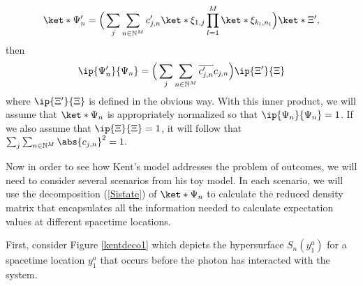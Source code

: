 \documentclass[12pt]{report}
\begin{document}
$$ \ket*{\Psi_n'}=\Big(\sum_j\sum_{n\in\mathbb{N}^M} c'_{j,n}\ket*{\xi_{1,j}}\prod_{l=1}^{M}\ket*{\xi_{k_{l},n_l}}\Big)\ket*{\Xi'},$$ then
$$\ip{\Psi_n'}{\Psi_n}=\Big(\sum_j\sum_{n\in\mathbb{N}^M} \overline{c'_{j,n}}c_{j,n} \Big) \ip{\Xi'}{\Xi}$$
where $\ip{\Xi'}{\Xi}$ is defined in the obvious way. With this inner product, we will assume that $\ket*{\Psi_n}$ is appropriately normalized so that $\ip{\Psi_n}{\Psi_n}=1$. If we also assume that  $\ip{\Xi}{\Xi}=1$, it will follow that $\sum_j\sum_{n\in\mathbb{N}^M}\abs{c_{j,n}}^2=1.$

Now in order to see how Kent's model addresses the problem of outcomes, we will need to consider several scenarios from his toy model. In each scenario, we will use the decomposition (\ref{Sistate}) of $\ket*{\Psi_n}$ to calculate the reduced density matrix that encapsulates all the information needed to calculate expectation values at different spacetime locations. 

First, consider Figure \ref{kentdeco1} which depicts the hypersurface $S_n(y^a_1)$ for a spacetime location $y^a_1$ that occurs before the photon has interacted with the system.
\end{document}
